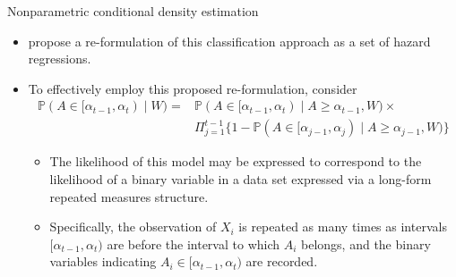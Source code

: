\documentclass{beamer}
\newcommand{\pr}{\mathbb{P}}
\begin{document}
\begin{frame}[c]{Nonparametric conditional density estimation}

\begin{center}
\begin{itemize}
  \itemsep8pt
  \item \cite{diaz2011super} propose a re-formulation of this classification
    approach as a set of hazard regressions.
  \item To effectively employ this proposed re-formulation, consider
    \begin{align*}
      \pr (A \in [\alpha_{t-1}, \alpha_t) \mid W) =& \pr (A \in [\alpha_{t-1},
      \alpha_t) \mid A \geq \alpha_{t-1}, W) \times  \\ & \Pi_{j = 1}^{t -1}
      \{1 - \pr (A \in [\alpha_{j-1}, \alpha_j) \mid A \geq \alpha_{j-1}, W) \}
    \end{align*}
    \vspace{0.25em}
    \begin{itemize}
      \itemsep4pt
      \item The likelihood of this model may be expressed to correspond to the
        likelihood of a binary variable in a data set expressed via a long-form
        repeated measures structure.
      \item Specifically, the observation of $X_i$ is repeated as many times as
        intervals $[\alpha_{t-1}, \alpha_t)$ are before the interval to which
        $A_i$ belongs, and the binary variables indicating $A_i \in
        [\alpha_{t-1}, \alpha_t)$ are recorded.
    \end{itemize}
\end{itemize}
\end{center}

\note{
}

\end{frame}

\end{document}
